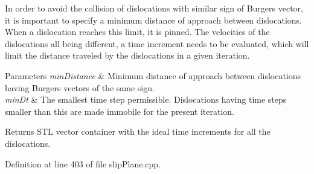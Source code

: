 In order to avoid the collision of dislocations with similar sign of Burgers vector, it is important to specify a minimum distance of approach between dislocations. When a dislocation reaches this limit, it is pinned. The velocities of the dislocations all being different, a time increment needs to be evaluated, which will limit the distance traveled by the dislocations in a given iteration. 
\begin{DoxyParams}{Parameters}
{\em min\-Distance} & Minimum distance of approach between dislocations having Burgers vectors of the same sign. \\
\hline
{\em min\-Dt} & The smallest time step permissible. Dislocations having time steps smaller than this are made immobile for the present iteration. \\
\hline
\end{DoxyParams}
\begin{DoxyReturn}{Returns}
S\-T\-L vector container with the ideal time increments for all the dislocations. 
\end{DoxyReturn}


Definition at line 403 of file slip\-Plane.\-cpp.


